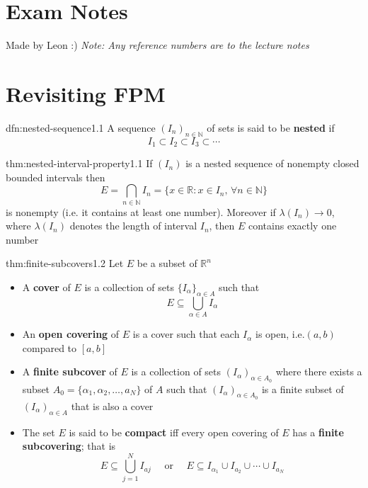 \documentclass[landscape, 8pt]{extarticle}
\begin{document}
\setlength{\abovedisplayskip}{3.5pt}
\setlength{\belowdisplayskip}{3.5pt}
\setlength{\abovedisplayshortskip}{3.5pt}
\setlength{\belowdisplayshortskip}{3.5pt}

\begin{multicols}{3}
\raggedcolumns


\section*{\huge Exam Notes}
Made by Leon :) \textit{Note: Any reference numbers are to the lecture notes}

\vspace{-5pt}
\section{Revisiting FPM}

\begin{dfn}{dfn:nested-sequence}{1.1}
	A sequence $(I_{n})_{n\in\mathbb{N}}$ of sets is said to be \textbf{nested} if
	\[I_{1} \subset I_{2} \subset I_{3} \subset \cdots\]
\end{dfn}

\begin{thm}{thm:nested-interval-property}{1.1}
	If $(I_{n})$ is a nested sequence of nonempty closed bounded intervals then
	$$E = \bigcap\limits_{n\in\mathbb{N}} I_{n} = \{x\in\mathbb{R}: x\in I_{n},\,\forall n\in\mathbb{N}\}$$
	is nonempty (i.e. it contains at least one number). Moreover if $\lambda(I_{n})\to 0$, where $\lambda(I_{n})$ denotes the length of interval $I_{n}$, then $E$ contains exactly one number
\end{thm}

\begin{thm}[Covers]{thm:finite-subcovers}{1.2}
	Let $E$ be a subset of $\mathbb{R}^n$
	\begin{itemize}
		\setlength\itemsep{0em}
		\item A \textbf{cover} of $E$ is a collection of sets  $\{I_{\alpha}\}_{\alpha\in A}$ such that
			\[E\subseteq \bigcup\limits_{\alpha\in A} I_{\alpha}\]
		\item An \textbf{open covering} of $E$ is a cover such that each $I_{\alpha}$ is open, i.e.$(a,b)$ compared to $[a,b]$
		\item A \textbf{finite subcover} of $E$ is a collection of sets $(I_{\alpha})_{\alpha\in A_{0}}$ where there exists a subset $A_{0} = \{\alpha_{1}, \alpha_{2}, \dots, a_{N}\}$ of $A$ such that $(I_{\alpha})_{\alpha\in A_{0}}$ is a finite subset of $(I_{\alpha})_{\alpha\in A}$ that is also a cover
		\item The set $E$ is said to be \textbf{compact} iff every open covering of $E$ has a \textbf{finite subcovering}; that is
			\[E\subseteq \bigcup\limits_{j=1}^{N} I_{aj} \quad \text{ or } \quad E \subseteq I_{\alpha_{1}} \cup I_{a_{2}} \cup \cdots \cup I_{a_{N}}\]
	\end{itemize}
\end{thm}


\end{multicols}
\end{document}
